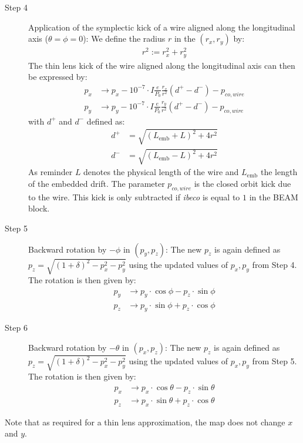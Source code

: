 \documentclass[english]{article}
\begin{document}
\begin{description}
\item[Step 4] Application of the symplectic kick of a wire aligned along the longitudinal axis ($\theta=\phi=0$): We define the radius $r$ in the $(r_x,r_y)$ by:
  \begin{align}
  r^2:=r_x^2+r_y^2
  \end{align}
The thin lens kick of the wire aligned along the longitudinal axis can then be expressed by:
 \begin{align}
 p_x & \to p_x - 10^{-7}\cdot I \frac{e}{P_0}\frac{r_x}{r^2} \left(d^+-d^- \right) - p_{co,wire} \nonumber\\
 p_y & \to p_y - 10^{-7}\cdot I \frac{e}{P_0}\frac{r_y}{r^2} \left(d^+-d^- \right) -p_{co,wire} 
 \end{align}
with $d^+$ and $d^-$ defined as:
 \begin{align}
d^+&=\sqrt{(L_{\mathrm{emb}}+L)^2+4r^2}\\
d^-&=\sqrt{(L_{\mathrm{emb}}-L)^2+4r^2}
 \end{align}
As reminder $L$ denotes the physical length of the wire and $L_{\mathrm{emb}}$ the length of the embedded drift. The parameter $p_{co,wire}$ is the closed orbit kick due to the wire. This kick is only subtracted if \emph{ibeco} is equal to $1$ in the BEAM block.

\item[Step 5] Backward rotation by $-\phi$ in $(p_y,p_z)$: The new $p_z$ is again defined as
$p_z = \sqrt{(1+\delta)^2-p_x^2-p_y^2}$ using the updated values of $p_x,p_y$ from Step 4. The rotation is then given by:
\begin{align}
p_y & \to   p_y \cdot \cos \phi - p_z \cdot \sin\phi \nonumber\\
p_z & \to   p_y \cdot \sin \phi + p_z \cdot \cos\phi 
\end{align}
\item[Step 6] Backward rotation by $-\theta$ in $(p_x,p_z)$: The new $p_z$ is again defined as
$p_z = \sqrt{(1+\delta)^2-p_x^2-p_y^2}$ using the updated values of $p_x,p_y$ from Step 5. The rotation is then given by:
\begin{align}
 p_x & \to   p_x \cdot \cos \theta - p_z \cdot \sin\theta \nonumber\\
 p_z & \to   p_x \cdot \sin \theta + p_z \cdot \cos\theta 
\end{align}
\end{description}
Note that as required for a thin lens approximation, the map does not change $x$ and $y$.
\end{document}
